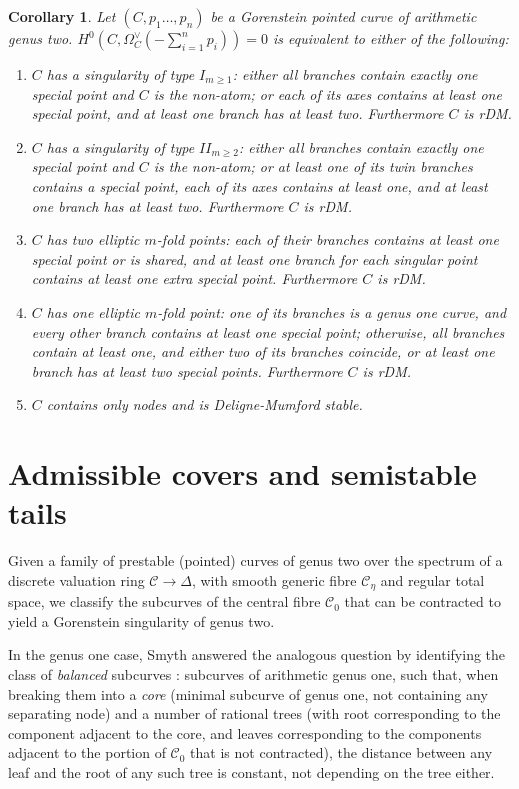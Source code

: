 \documentclass{compositio}
\renewcommand{\to}{\rightarrow}
\newcommand{\dvr}{\Delta}
\theoremstyle{plain}
\newtheorem{cor}[thm]{Corollary}
\theoremstyle{definition}
\theoremstyle{remark}
\begin{document}
\begin{cor}\label{cor:explicitnoaut}
 Let $(C,p_1\ldots,p_n)$ be a Gorenstein pointed curve of arithmetic genus two. $H^0(C,\Omega_C^\vee(-\sum_{i=1}^n p_i))=0$ is equivalent to either of the following:
 \begin{enumerate}[leftmargin=.6cm]
  \item $C$ has a singularity of type $I_{m\geq 1}$: either all branches contain exactly one special point and $C$ is the non-atom; or each of its axes contains at least one special point, and at least one branch has at least two. Furthermore $C$ is rDM.
  \item $C$ has a singularity of type $I\!I_{m\geq 2}$: either all branches contain exactly one special point and $C$ is the non-atom; or at least one of its twin branches contains a special point, each of its axes contains at least one, and at least one branch has at least two. Furthermore $C$ is rDM.
  \item $C$ has two elliptic $m$-fold points: each of their branches contains at least one special point or is shared, and at least one branch for each singular point contains at least one extra special point. Furthermore $C$ is rDM.
  \item $C$ has one elliptic $m$-fold point: one of its branches is a genus one curve, and every other branch contains at least one special point; otherwise, all branches contain at least one, and either two of its branches coincide, or at least one branch has at least two special points. Furthermore $C$ is rDM.
  \item $C$ contains only nodes and is Deligne-Mumford stable.
 \end{enumerate}
\end{cor}

\section{Admissible covers and semistable tails}\label{sec:sstails}

Given a family of prestable (pointed) curves of genus two over the spectrum of a discrete valuation ring $\mathcal C\to\dvr$, with smooth generic fibre $\mathcal C_{\eta}$ and regular total space, we classify the subcurves of the central fibre $\mathcal C_{0}$ that can be contracted to yield a Gorenstein singularity of genus two. 

In the genus one case, Smyth answered the analogous question by identifying the class of \emph{balanced} subcurves \cite[Definition 2.11]{SMY1}: subcurves of arithmetic genus one, such that, when breaking them into a \emph{core} (minimal subcurve of genus one, not containing any separating node) and a number of rational trees (with root corresponding to the component adjacent to the core, and leaves corresponding to the components adjacent to the portion of $\mathcal C_0$ that is not contracted), the distance between any leaf and the root of any such tree is constant, not depending on the tree either.
\end{document}
